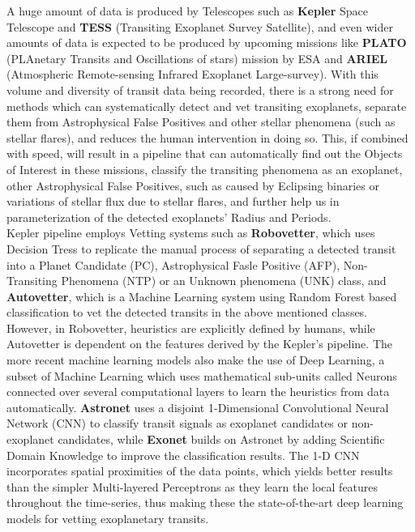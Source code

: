 




A huge amount of data is produced by Telescopes such as \textbf{Kepler} Space Telescope and \textbf{TESS} (Transiting Exoplanet Survey Satellite), and even wider amounts of data is expected to be produced by upcoming missions like \textbf{PLATO} (PLAnetary Transits and Oscillations of stars) mission by ESA and \textbf{ARIEL} (Atmospheric Remote-sensing Infrared Exoplanet Large-survey). With this volume and diversity of transit data being recorded, there is a strong need for methods which can systematically detect and vet transiting exoplanets, separate them from Astrophysical False Positives and other stellar phenomena (such as stellar flares), and reduces the human intervention in doing so. This, if combined with speed, will result in a pipeline that can automatically find out the Objects of Interest in these missions, classify the transiting phenomena as an exoplanet, other Astrophysical False Positives, such as caused by Eclipsing binaries or variations of stellar flux due to stellar flares, and further help us in parameterization of the detected exoplanets' Radius and Periods.\\

Kepler pipeline employs Vetting systems such as \textbf{Robovetter}, which uses Decision Tress to replicate the manual process of separating a detected transit into a Planet Candidate (PC), Astrophysical Fasle Positive (AFP), Non-Transiting Phenomena (NTP) or an Unknown phenomena (UNK) class, and \textbf{Autovetter}, which is a Machine Learning system using Random Forest based classification to vet the detected transits in the above mentioned classes. However, in Robovetter, heuristics are explicitly defined by humans, while Autovetter is dependent on the features derived by the Kepler's pipeline. The more recent machine learning models also make the use of Deep Learning, a subset of Machine Learning which uses mathematical sub-units called Neurons connected over several computational layers to learn the heuristics from data automatically. \textbf{Astronet} uses a disjoint 1-Dimensional Convolutional Neural Network (CNN) to classify transit signals as exoplanet candidates or non-exoplanet candidates, while \textbf{Exonet} builds on Astronet by adding Scientific Domain Knowledge to improve the classification results. The 1-D CNN incorporates spatial proximities of the data points, which yields better results than the simpler Multi-layered Perceptrons as they learn the local features throughout the time-series, thus making these the state-of-the-art deep learning models for vetting exoplanetary transits.\\

